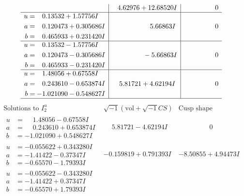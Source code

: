 \documentclass[1p]{elsarticle_modified}
\theoremstyle{definition}
\newcommand{\I}{\sqrt{-1}}
\begin{document}
$$\begin{array}{c|c|c}
 & \phantom{-}4.62976 + 12.68520 I & \phantom{-0.000000 } 0 \\ \hline\begin{aligned}
u &= \phantom{-}0.13532 + 1.57756 I \\
a &= \phantom{-}0.120473 + 0.305686 I \\
b &= \phantom{-}0.465933 + 0.231420 I\end{aligned}
 & \phantom{-0.000000 -}5.66863 I & \phantom{-0.000000 } 0 \\ \hline\begin{aligned}
u &= \phantom{-}0.13532 - 1.57756 I \\
a &= \phantom{-}0.120473 - 0.305686 I \\
b &= \phantom{-}0.465933 - 0.231420 I\end{aligned}
 & \phantom{-0.000000 } -5.66863 I & \phantom{-0.000000 } 0 \\ \hline\begin{aligned}
u &= \phantom{-}1.48056 + 0.67558 I \\
a &= \phantom{-}0.243610 - 0.653874 I \\
b &= -1.021090 - 0.548627 I\end{aligned}
 & \phantom{-}5.81721 + 4.62194 I & \phantom{-0.000000 } 0\\
 \hline 
 \end{array}$$\newpage$$\begin{array}{c|c|c}  
\text{Solutions to }I^u_{2}& \I (\text{vol} + \sqrt{-1}CS) & \text{Cusp shape}\\
 \hline 
\begin{aligned}
u &= \phantom{-}1.48056 - 0.67558 I \\
a &= \phantom{-}0.243610 + 0.653874 I \\
b &= -1.021090 + 0.548627 I\end{aligned}
 & \phantom{-}5.81721 - 4.62194 I & \phantom{-0.000000 } 0 \\ \hline\begin{aligned}
u &= -0.055622 + 0.343280 I \\
a &= -1.41422 - 0.37347 I \\
b &= -0.65570 - 1.79393 I\end{aligned}
 & -0.159819 + 0.791393 I & -8.50855 + 4.94473 I \\ \hline\begin{aligned}
u &= -0.055622 - 0.343280 I \\
a &= -1.41422 + 0.37347 I \\
b &= -0.65570 + 1.79393 I\end{aligned}

\end{array}$$
\end{document}
